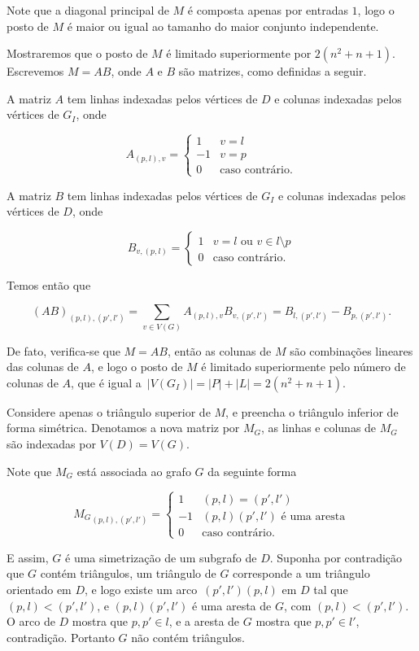 Note que a diagonal principal de $M$ é composta apenas por entradas $1$, logo o posto de $M$ é maior ou igual ao tamanho do maior conjunto independente.

Mostraremos que o posto de $M$ é limitado superiormente por $2(n^2 + n + 1)$. Escrevemos $M = AB$, onde $A$ e $B$ são matrizes, como definidas a seguir.

A matriz $A$ tem linhas indexadas pelos vértices de $D$ e colunas indexadas pelos vértices de $G_I$, onde

\[ A_{(p,l),v} = \begin{cases} 
      1 & v = l \\
      -1 & v = p \\
      0 & \text{caso contrário.}
   \end{cases}
\]

A matriz $B$ tem linhas indexadas pelos vértices de $G_I$ e colunas indexadas pelos vértices de $D$, onde

\[ B_{v,(p,l)} = \begin{cases} 
      1 & v = l \text{ ou } v\in l \setminus p\\
      0 & \text{caso contrário.}
   \end{cases}
\]

Temos então que 

\[(AB)_{(p,l),(p',l')} = \sum\limits_{v \in V(G)} A_{(p,l),v} B_{v,(p',l')} = B_{l,(p',l')} - B_{p,(p',l')}.\]

De fato, verifica-se que $M = AB$, então as colunas de $M$ são combinações lineares das colunas de $A$, e logo o posto de $M$ é limitado superiormente pelo número de colunas de $A$, que é igual a~$|V(G_I)| = |P| + |L| = 2(n^2 + n + 1)$.

Considere apenas o triângulo superior de $M$, e preencha o triângulo inferior de forma simétrica. Denotamos a nova matriz por $M_G$, as linhas e colunas de $M_G$ são indexadas por $V(D) = V(G)$.

Note que $M_G$ está associada ao grafo $G$ da seguinte forma

\[ {M_G}_{(p,l), (p',l')} = \begin{cases} 
      1 & (p,l) = (p',l')\\
      -1 & (p,l)(p',l') \text{ é uma aresta}\\
      0 & \text{caso contrário.}
   \end{cases}
\]

E assim, $G$ é uma simetrização de um subgrafo de $D$. Suponha por contradição que $G$ contém triângulos, um triângulo de $G$ corresponde a um triângulo orientado em $D$, e logo existe um arco~$(p',l')(p,l)$ em $D$ tal que $(p,l) < (p',l')$, e $(p,l)(p',l')$ é uma aresta de $G$, com $(p,l) < (p',l')$. O arco de $D$ mostra que $p,p' \in l$, e a aresta de $G$ mostra que $p,p' \in l'$, contradição. Portanto $G$ não contém triângulos.

